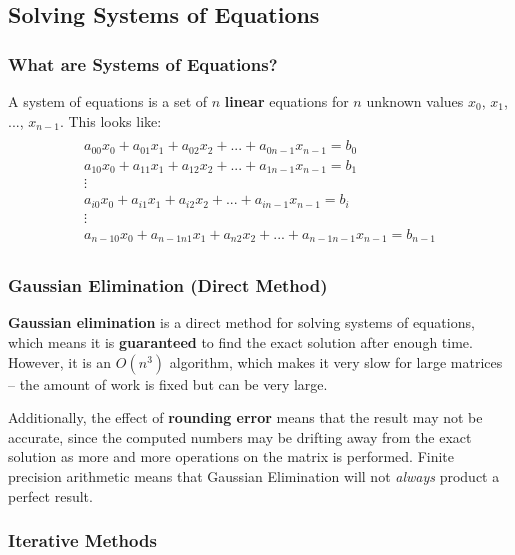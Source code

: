 \documentclass{article}
\begin{document}
\subsection{Solving Systems of Equations}

\subsubsection{What are Systems of Equations?}

A system of equations is a set of $n$ \textbf{linear} equations for $n$ unknown values $x_0$, $x_1$, ..., $x_{n-1}$. This looks like:
\begin{multline}\\
	a_{00}x_0 + a_{01}x_1 + a_{02}x_2 + ... + a_{0n -1}x_{n - 1} = b_0 \\
	a_{10}x_0 + a_{11}x_1 + a_{12}x_2 + ... + a_{1n -1}x_{n - 1} = b_1 \\
	\vdots \\
	a_{i0}x_0 + a_{i1}x_1 + a_{i2}x_2 + ... + a_{in -1}x_{n - 1} = b_i \\
	\vdots \\
	a_{n-10}x_0 + a_{n-1n1}x_1 + a_{n2}x_2 + ... + a_{n-1n -1}x_{n - 1} = b_{n-1} \\
	\label{eq:system-of-equations}
\end{multline}

\subsubsection{Gaussian Elimination (Direct Method)}

\textbf{Gaussian elimination} is a direct method for solving systems of equations, which means it is \textbf{guaranteed} to find the exact solution after enough time. However, it is an $O(n^3)$ algorithm, which makes it very slow for large matrices -- the amount of work is fixed but can be very large.

Additionally, the effect of \textbf{rounding error} means that the result may not be accurate, since the computed numbers may be drifting away from the exact solution as more and more operations on the matrix is performed. Finite precision arithmetic means that Gaussian Elimination will not \textit{always} product a perfect result.

\subsubsection{Iterative Methods}
\end{document}
